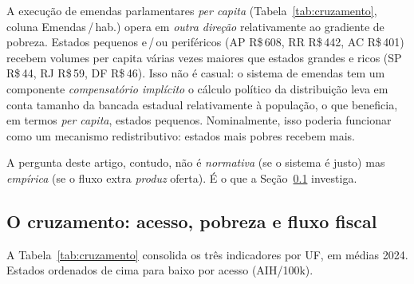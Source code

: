 \documentclass[12pt,a4paper,oneside]{article}
\newcommand{\rs}{R\$\,}
\begin{document}
A execução de emendas parlamentares \textit{per capita}
(Tabela~\ref{tab:cruzamento}, coluna Emendas\,/\,hab.) opera em
\textit{outra direção} relativamente ao gradiente de pobreza.
Estados pequenos e\,/\,ou periféricos (AP \rs 608, RR \rs 442,
AC \rs 401) recebem volumes per capita várias vezes maiores que
estados grandes e ricos (SP \rs 44, RJ \rs 59, DF \rs 46). Isso
não é casual: o sistema de emendas tem um componente
\textit{compensatório implícito} \textemdash{} o cálculo
político da distribuição leva em conta tamanho da bancada
estadual relativamente à população, o que beneficia, em termos
\textit{per capita}, estados pequenos. Nominalmente, isso
poderia funcionar como um mecanismo redistributivo: estados
mais pobres recebem mais.

A pergunta deste artigo, contudo, não é \textit{normativa} (se
o sistema é justo) mas \textit{empírica} (se o fluxo extra
\textit{produz} oferta). É o que a Seção~\ref{sub:cruzamento}
investiga.

\subsection{O cruzamento: acesso, pobreza e fluxo
fiscal}\label{sub:cruzamento}

A Tabela~\ref{tab:cruzamento} consolida os três indicadores por
UF, em médias 2024. Estados ordenados de cima
para baixo por acesso (AIH/100k).
\end{document}
